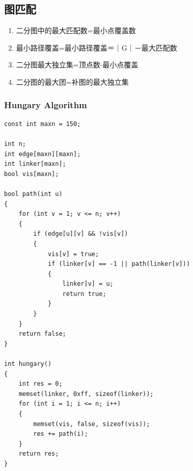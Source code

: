 \documentclass[twoside]{article}
\begin{document}
\subsection{图匹配}
\begin{enumerate}
\item 二分图中的最大匹配数=最小点覆盖数
\item 最小路径覆盖=最小路径覆盖＝｜G｜－最大匹配数
\item 二分图最大独立集=顶点数-最小点覆盖
\item 二分图的最大团=补图的最大独立集
\end{enumerate}\subsubsection{Hungary Algorithm}
\begin{lstlisting}
const int maxn = 150;

int n;
int edge[maxn][maxn];
int linker[maxn];
bool vis[maxn];

bool path(int u)
{
    for (int v = 1; v <= n; v++)
    {
        if (edge[u][v] && !vis[v])
        {
            vis[v] = true;
            if (linker[v] == -1 || path(linker[v]))
            {
                linker[v] = u;
                return true;
            }
        }
    }
    return false;
}

int hungary()
{
    int res = 0;
    memset(linker, 0xff, sizeof(linker));
    for (int i = 1; i <= n; i++)
    {
        memset(vis, false, sizeof(vis));
        res += path(i);
    }
    return res;
}\end{lstlisting}
\end{document}
